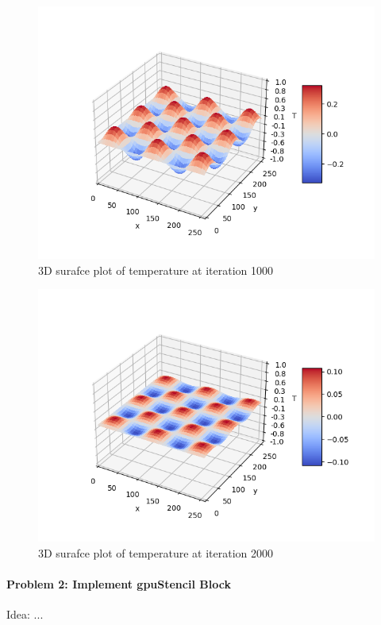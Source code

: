 \documentclass[12pt,letterpaper,twoside]{article}
\begin{document}
\begin{figure}[h]
    \center
    \includegraphics[scale=0.7]{global_1000.png}
    \caption{3D surafce plot of temperature at iteration 1000}
\end{figure}

\begin{figure}[h]
    \center
    \includegraphics[scale=0.7]{global_2000.png}
    \caption{3D surafce plot of temperature at iteration 2000}
\end{figure}


\paragraph{Problem 2: Implement gpuStencil Block } Idea: ...
\end{document}
